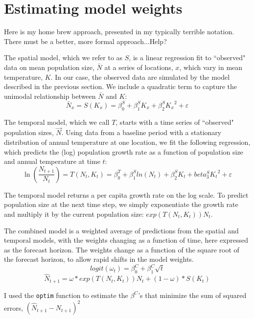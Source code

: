 \documentclass[11pt]{article}
\begin{document}
\section*{Estimating model weights}

Here is my home brew approach, presented in my typically terrible notation. There must be a better, more formal approach...Help?

The spatial model, which we refer to as $S$, is a linear regression fit to ``observed" data on mean population size, $\bar{N}$ at a series of locations, $x$, which vary in mean temperature, $K$. In our case, the observed data are simulated by the model described in the previous section. We include a quadratic term to capture the unimodal relationship between  $\bar{N}$ and $K$:
 \begin{equation}
 \bar{N}_x = S(K_x) = \beta^S_0 +  \beta^S_1 K_x +\beta^S_2 {K_x}^2 + \varepsilon
 \label{eqn:spatial_regression}
 \end{equation}

The temporal model, which we call $T$, starts with a time series of ``observed" population sizes, $\vec{N}$. Using data from a baseline period with a stationary distribution of annual temperature at one location, we fit the following regression, which predicts the (log) population growth rate as a function of population size and annual temperature at time $t$:
 \begin{equation}
 \ln(\frac{N_{t+1}}{N_t}) = T(N_t,K_t) = \beta^T_0 +  \beta^S_1 ln(N_t) +\beta^S_2 K_t + beta^S_3 {K_t}^2 +  \varepsilon
 \label{eqn:temporal_regression}
 \end{equation}
 
The temporal model returns a per capita growth rate on the log scale. To predict population size at the next time step, we simply exponentiate the growth rate and multiply it by the current population size: $exp(T(N_t,K_t)) N_t$.

The combined model is a weighted average of predictions from the spatial and temporal models, with the weights changing as a function of time, here expressed as the forecast horizon. The weights change as a function of the square root of the forecast horizon, to allow rapid shifts in the model weights. 
\begin{equation}
logit(\omega_t)=\beta^C_0 + \beta^C_1 \sqrt{t}
\label{eqn:weights}
\end{equation}
\begin{equation}
\hat{N}_{t+1} = \omega * exp(T(N_{t},K_t)) N_t + (1-\omega) * S(K_t) 
\label{eqn:combined_model}
\end{equation}

I used the \texttt{optim} function to estimate the $\beta^C$'s that minimize the sum of squared errors, $(\hat{N}_{t+1} - N_{t+1})^2$
\end{document}
